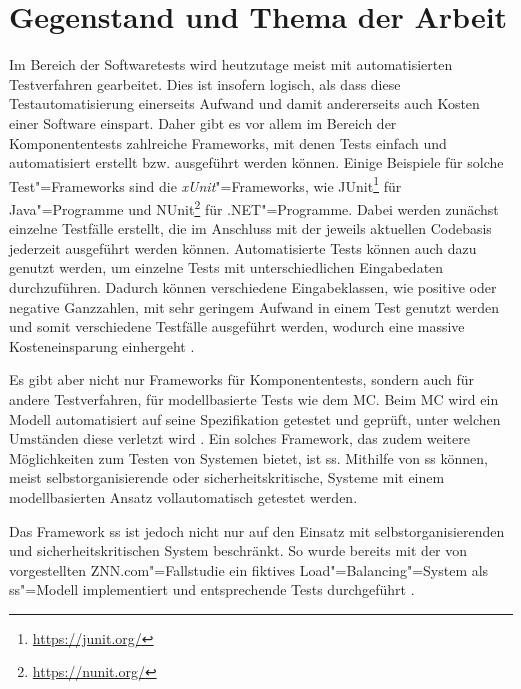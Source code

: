 \chapter{Gegenstand und Thema der Arbeit}
\label{ch:intro}

Im Bereich der Softwaretests wird heutzutage meist mit automatisierten Testverfahren gearbeitet.
Dies ist insofern logisch, als dass diese Testautomatisierung einerseits Aufwand und damit andererseits auch Kosten einer Software einspart.
Daher gibt es vor allem im Bereich der Komponententests zahlreiche Frameworks, mit denen Tests einfach und automatisiert erstellt bzw. ausgeführt werden können.
Einige Beispiele für solche Test"=Frameworks sind die \emph{xUnit}"=Frameworks, wie JUnit\footnote{\url{https://junit.org/}} für Java"=Programme und NUnit\footnote{\url{https://nunit.org/}} für .NET"=Programme.
Dabei werden zunächst einzelne Testfälle erstellt, die im Anschluss mit der jeweils aktuellen Codebasis jederzeit ausgeführt werden können.
Automatisierte Tests können auch dazu genutzt werden, um einzelne Tests mit unterschiedlichen Eingabedaten durchzuführen.
Dadurch können verschiedene Eingabeklassen, wie \zB positive oder negative Ganzzahlen, mit sehr geringem Aufwand in einem Test genutzt werden und somit verschiedene Testfälle ausgeführt werden, wodurch eine massive Kosteneinsparung einhergeht \cite{Polo2013}.

Es gibt aber nicht nur Frameworks für Komponententests, sondern auch für andere Testverfahren, \zB für modellbasierte Tests wie dem \gls{MC}.
Beim \gls{MC} wird ein Modell automatisiert auf seine Spezifikation getestet und geprüft, unter welchen Umständen diese verletzt wird \cite{Baier2008,Habermaier2015}.
Ein solches Framework, das zudem weitere Möglichkeiten zum Testen von Systemen bietet, ist \gls{ss}.
Mithilfe von \gls{ss} können, meist selbstorganisierende oder sicherheitskritische, Systeme mit einem modellbasierten Ansatz vollautomatisch getestet werden.

Das Framework \gls{ss} ist jedoch nicht nur auf den Einsatz mit selbstorganisierenden und sicherheitskritischen System beschränkt.
So wurde bereits mit der von \citeauthor{Cheng2008} vorgestellten ZNN.com"=Fallstudie \cite{Cheng2008} ein fiktives Load"=Balancing"=System als \gls{ss}"=Modell implementiert und entsprechende Tests durchgeführt \cite{Eberhardinger2017}.

